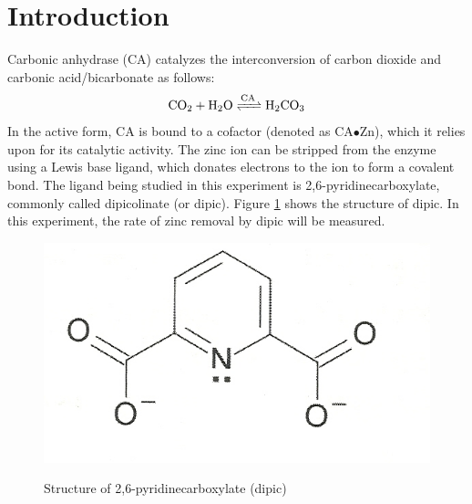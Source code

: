 \section{Introduction}
Carbonic anhydrase (CA) catalyzes the interconversion of carbon dioxide and carbonic acid/bicarbonate as follows:
\begin{align}\label{eqn:ca_reaction}
\ce{CO_2 + H_2O 
<=>[\ce{CA}] 
H_2CO_3}
\end{align}
In the active form, CA is bound to a  cofactor (denoted as CA$\bullet$Zn), which it relies upon for its catalytic activity. The zinc ion can be stripped from the enzyme using a Lewis base ligand, which donates electrons to the ion to form a covalent bond. The ligand being studied in this experiment is 2,6-pyridinecarboxylate, commonly called dipicolinate (or dipic). Figure \ref{fig:dipic} shows the structure of dipic. In this experiment, the rate of zinc removal by dipic will be measured.
\begin{figure}[h]
  \includegraphics[scale=0.5]{./Figures/dipic.jpg}\\
  \caption{Structure of 2,6-pyridinecarboxylate (dipic)\cite{bib:lab_manual}}\label{fig:dipic}
\end{figure}
 
